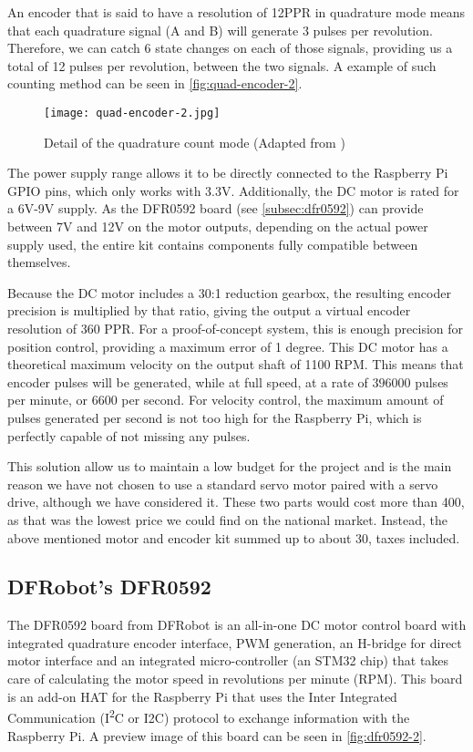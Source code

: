 An encoder that is said to have a resolution of 12PPR in quadrature mode means that each quadrature signal (A and B) will generate 3 pulses per revolution.
Therefore, we can catch 6 state changes on each of those signals, providing us a total of 12 pulses per revolution, between the two signals.
A example of such counting method can be seen in \autoref{fig:quad-encoder-2}.

\begin{figure}[htp]
	\centering
	\texttt{[image: quad-encoder-2.jpg]}
	\caption{Detail of the quadrature count mode (Adapted from \cite{technology:quad-encoder})}
	\label{fig:quad-encoder-2}
\end{figure}

The power supply range allows it to be directly connected to the Raspberry Pi GPIO pins, which only works with 3.3V.
Additionally, the DC motor is rated for a 6V-9V supply.
As the DFR0592 board (see \autoref{subsec:dfr0592}) can provide between 7V and 12V on the motor outputs, depending on the actual power supply used, the entire kit contains components fully compatible between themselves.

Because the DC motor includes a 30:1 reduction gearbox, the resulting encoder precision is multiplied by that ratio, giving the output a virtual encoder resolution of 360 PPR.
For a proof-of-concept system, this is enough precision for position control, providing a maximum error of 1 degree.
This DC motor has a theoretical maximum velocity on the output shaft of 1100 RPM.
This means that encoder pulses will be generated, while at full speed, at a rate of $396000$ pulses per minute, or $6600$ per second.
For velocity control, the maximum amount of pulses generated per second is not too high for the Raspberry Pi, which is perfectly capable of not missing any pulses.

This solution allow us to maintain a low budget for the project and is the main reason we have not chosen to use a standard servo motor paired with a servo drive, although we have considered it.
These two parts would cost more than 400\texteuro, as that was the lowest price we could find on the national market.
Instead, the above mentioned motor and encoder kit summed up to about 30\texteuro, taxes included.

\subsection{DFRobot's DFR0592} \label{subsec:dfr0592}
The DFR0592 board from DFRobot is an all-in-one DC motor control board with integrated quadrature encoder interface, PWM generation, an H-bridge for direct motor interface and an integrated micro-controller (an STM32 chip) that takes care of calculating the motor speed in revolutions per minute (RPM).
This board is an add-on HAT for the Raspberry Pi that uses the Inter Integrated Communication (I\textsuperscript{2}C or I2C) protocol to exchange information with the Raspberry Pi.
A preview image of this board can be seen in \autoref{fig:dfr0592-2}.

